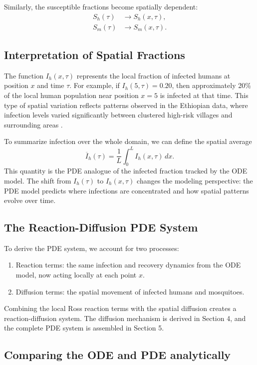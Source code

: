 \documentclass[12pt]{article}
\begin{document}
Similarly, the susceptible fractions become spatially dependent:
\begin{align}
S_h(\tau) &\longrightarrow S_h(x,\tau), \\
S_m(\tau) &\longrightarrow S_m(x,\tau).
\end{align}

\subsection{Interpretation of Spatial Fractions}

The function \(I_h(x,\tau)\) represents the local fraction of infected humans at position \(x\) and time \(\tau\). For example, if \(I_h(5,\tau)=0.20\), then approximately 20\% of the local human population near position \(x=5\) is infected at that time. This type of spatial variation reflects patterns observed in the Ethiopian data, where infection levels varied significantly between clustered high-risk villages and surrounding areas \cite{Alemu2014}.

To summarize infection over the whole domain, we can define the spatial average
\[
\overline{I}_h(\tau)=\frac{1}{L}\int_0^L I_h(x,\tau)\,dx.
\]
This quantity is the PDE analogue of the infected fraction tracked by the ODE model. The shift from \(I_h(\tau)\) to \(I_h(x,\tau)\) changes the modeling perspective: the PDE model predicts where infections are concentrated and how spatial patterns evolve over time.

\subsection{The Reaction-Diffusion PDE System}

To derive the PDE system, we account for two processes:

\begin{enumerate}
    \item Reaction terms: the same infection and recovery dynamics from the ODE model, now acting locally at each point $x$.
    \item Diffusion terms: the spatial movement of infected humans and mosquitoes.
\end{enumerate}

Combining the local Ross reaction terms with the spatial  diffusion creates a reaction-diffusion system. The diffusion mechanism is derived in Section 4, and the complete PDE system is assembled in Section 5. 

\subsection{Comparing the ODE and PDE analytically}
\end{document}
